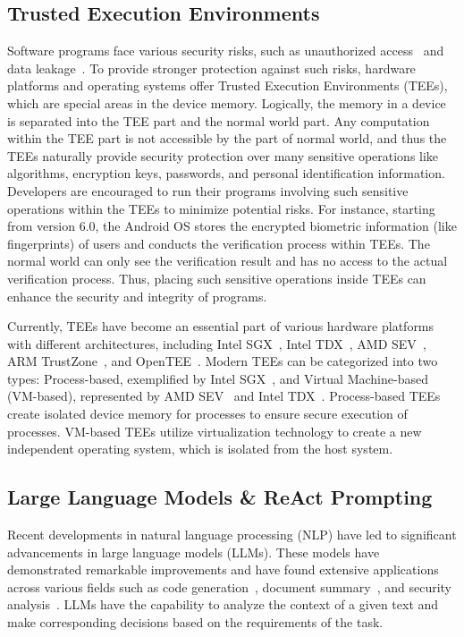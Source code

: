 \subsection{Trusted Execution Environments}
Software programs face various security risks, such as unauthorized access~\cite{9664230,han2023mytee,tkdeMaLLXJSM24,wang2023tee,ait2025tee} and data leakage~\cite{liu2022extending,zhang2020privacyscope}.
To provide stronger protection against such risks, hardware platforms and operating systems offer Trusted Execution Environments (TEEs), which are special areas in the device memory.
Logically, the memory in a device is separated into the TEE part and the normal world part.
Any computation within the TEE part is not accessible by the part of normal world, and thus the TEEs naturally provide security protection over many sensitive operations like algorithms, encryption keys, passwords, and personal identification information.
Developers are encouraged to run their programs involving such sensitive operations within the TEEs to minimize potential risks.
For instance, starting from version 6.0, the Android OS stores the encrypted biometric information (like fingerprints) of users and conducts the verification process within TEEs.
The normal world can only see the verification result and has no access to the actual verification process.
Thus, placing such sensitive operations inside TEEs can enhance the security and integrity of programs.

Currently, TEEs have become an essential part of various hardware platforms with different architectures, including Intel SGX~\cite{Intel_SGX}, Intel TDX~\cite{Intel_TDX}, AMD SEV~\cite{AMD_SEV}, ARM TrustZone~\cite{ARM_TrustZone}, and OpenTEE~\cite{OpenTEE}.
Modern TEEs can be categorized into two types: Process-based, exemplified by Intel SGX~\cite{Intel_SGX}, and Virtual Machine-based (VM-based), represented by AMD SEV~\cite{AMD_SEV} and Intel TDX~\cite{Intel_TDX}.
Process-based TEEs create isolated device memory for processes to ensure secure execution of processes.
VM-based TEEs utilize virtualization technology to create a new independent operating system, which is isolated from the host system.

\subsection{Large Language Models \& ReAct Prompting}
Recent developments in natural language processing (NLP) have led to significant advancements in large language models (LLMs). 
These models have demonstrated remarkable improvements and have found extensive applications across various fields such as code generation~\cite{yan2023closer,zeng2022extensive}, document summary~\cite{mastropaolo2021empirical,geng2024large}, and security analysis~\cite{wu2023effective,ren2023misuse}.
LLMs have the capability to analyze the context of a given text and make corresponding decisions based on the requirements of the task.

